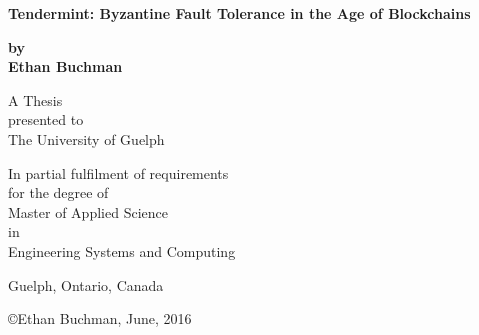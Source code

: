 \begin{titlepage}
    \begin{center}
        \vspace*{1cm}
        
        \textbf{\large{Tendermint: Byzantine Fault Tolerance in the Age of Blockchains}}\\
        
        \vspace{1 cm}

        \textbf{by} \\
        \vspace{1 cm}
        \textbf{Ethan Buchman}
        
        \vfill
        
        A Thesis \\
	presented to \\
	The University of Guelph 

        \vspace{0.8cm}

	In partial fulfilment of requirements \\
	for the degree of \\
	Master of Applied Science \\
       	in \\
	Engineering Systems and Computing

	\vspace{0.8cm}
	Guelph, Ontario, Canada

	\vspace{0.8cm}
	\copyright Ethan Buchman, June, 2016
    \end{center}
\end{titlepage}
